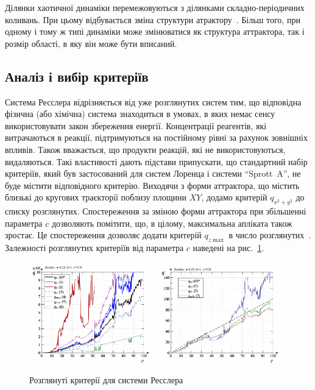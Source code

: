 Ділянки хаотичної динаміки перемежовуються з ділянками
складно-періодичних коливань. При цьому відбувається зміна
структури атрактору~\cite{buscarino_sync_rossler, rosalie_rossler_template}. Більш того,
при одному і тому ж типі динаміки може змінюватися як структура
аттрактора, так і розмір області, в яку він може бути вписаний.


\subsection{Аналіз і вибір критеріїв} %

Система Ресслера відрізняється від уже розглянутих систем
тим, що відповідна фізична (або хімічна) система знаходиться в
умовах, в яких немає сенсу використовувати закон збереження
енергії. Концентрації реагентів, які витрачаються в реакції,
підтримуються на постійному рівні за рахунок зовнішніх
впливів. Також вважається,  що продукти
реакцій, які не використовуються, видаляються.
Такі властивості дають підстави
припускати, що стандартний набір критеріїв, який був
застосований для систем Лоренца і системи ``Sprott~A'', не буде
містити відповідного критерію. Виходячи з форми аттрактора,
що містить близькі до кругових траєкторії поблизу площини
$XY$, додамо критерій
$q_{x^2 + y^2} $ до списку розглянутих. Спостереження за зміною
форми аттрактора при збільшенні параметра
$c$ дозволяють помітити, що, в цілому, максимальна апліката
також зростає. Це спостереження дозволяє додати критерій
$ q_{z \max{}} $ в число розглянутих~\cite{atu_ISDMCI2012, atu_asau14}. Залежності
розглянутих критеріїв від параметра
$ c $ наведені на рис.~\ref{atu:f:ross_q}.


\begin{figure}[htb!]
\begin{center}
  \includegraphics[width=0.49\textwidth]{p/cha/ross/ross_q-p_q.png}
  \hfill
  \includegraphics[width=0.49\textwidth]{p/cha/ross/ross_q-p_q1.png}
\end{center}
\caption{Розглянуті критерії для системи Ресслера}
\label{atu:f:ross_q}
\end{figure}

